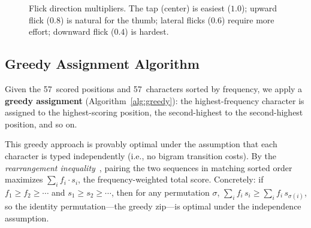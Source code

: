 \documentclass[10pt,twocolumn,a4paper]{article}
\begin{document}
\begin{figure}[t]
\centering
{}
\caption{Flick direction multipliers. The tap (center) is easiest ($1.0$); upward flick ($0.8$) is natural for the thumb; lateral flicks ($0.6$) require more effort; downward flick ($0.4$) is hardest.}
\label{fig:flick_mult}
\end{figure}

\subsection{Greedy Assignment Algorithm}
\label{sec:design_greedy}

Given the 57~scored positions and 57~characters sorted by frequency, we apply a \textbf{greedy assignment} (Algorithm~\ref{alg:greedy}): the highest-frequency character is assigned to the highest-scoring position, the second-highest to the second-highest position, and so on.

This greedy approach is provably optimal under the assumption that each character is typed independently (i.e., no bigram transition costs).
By the \emph{rearrangement inequality}~\cite{hardy1952}, pairing the two sequences in matching sorted order maximizes $\sum_i f_i \cdot s_i$, the frequency-weighted total score.
Concretely: if $f_1 \geq f_2 \geq \cdots$ and $s_1 \geq s_2 \geq \cdots$, then for any permutation $\sigma$, $\sum_i f_i \, s_i \geq \sum_i f_i \, s_{\sigma(i)}$, so the identity permutation---the greedy zip---is optimal under the independence assumption.
\end{document}
